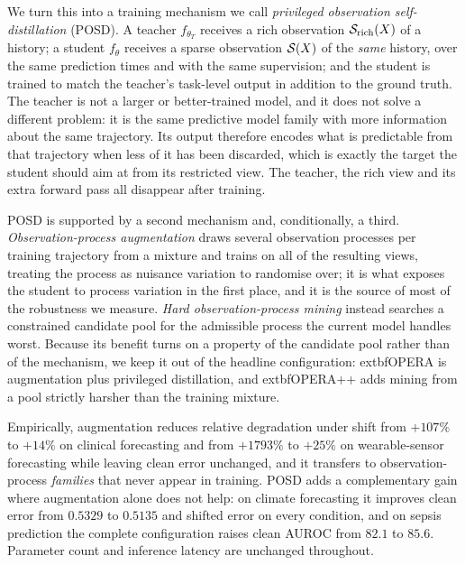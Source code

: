 We turn this into a training mechanism we call \emph{privileged observation self-distillation} (POSD). A teacher
$f_{\theta_T}$ receives a rich observation $\mathcal{S}_{\mathrm{rich}}(X)$ of a history; a student $f_\theta$
receives a sparse observation $\mathcal{S}(X)$ of the \emph{same} history, over the same prediction times and with the
same supervision; and the student is trained to match the teacher's task-level output in addition to the ground
truth. The teacher is not a larger or better-trained model, and it does not solve a different problem: it is the
same predictive model family with more information about the same trajectory. Its output therefore encodes what
is predictable from that trajectory when less of it has been discarded, which is exactly the target the student
should aim at from its restricted view. The teacher, the rich view and its extra forward pass all disappear
after training.

POSD is supported by a second mechanism and, conditionally, a third. \emph{Observation-process augmentation}
draws several observation processes per training trajectory from a mixture and trains on all of the resulting
views, treating the process as nuisance variation to randomise over; it is what exposes the student to process
variation in the first place, and it is the source of most of the robustness we measure. \emph{Hard
observation-process mining} instead searches a constrained candidate pool for the admissible process the current
model handles worst. Because its benefit turns on a property of the candidate pool rather than of the mechanism,
we keep it out of the headline configuration: 	extbf{OPERA} is augmentation plus privileged distillation, and
	extbf{OPERA++} adds mining from a pool strictly harsher than the training mixture.

Empirically, augmentation reduces relative degradation under shift from $+107\%$ to $+14\%$ on clinical
forecasting and from $+1793\%$ to $+25\%$ on wearable-sensor forecasting while leaving clean error unchanged, and
it transfers to observation-process \emph{families} that never appear in training. POSD adds a complementary
gain where augmentation alone does not help: on climate forecasting it improves clean error from $0.5329$ to
$0.5135$ and shifted error on every condition, and on sepsis prediction the complete configuration raises clean
AUROC from $82.1$ to $85.6$. Parameter count and inference latency are unchanged throughout.


